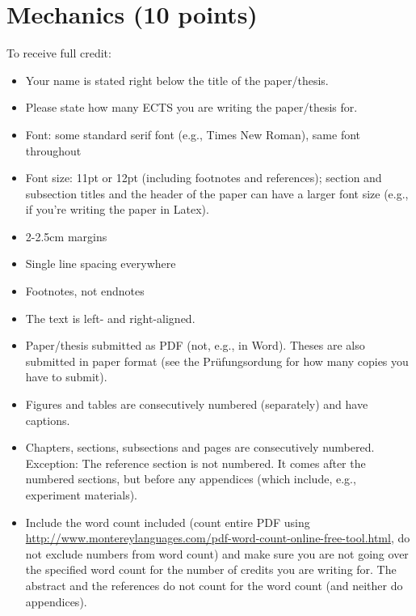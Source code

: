 \documentclass[11pt,fleqn,a4paper/thesis]{article}
\newcommand{\6}{\mbox{$[\hspace*{-.6mm}[$}}
\newcommand{\9}{\mbox{$]\hspace*{-.6mm}]$}}
\begin{document}
\section{Mechanics (10 points)}

To receive full credit:

\begin{itemize}[itemsep=-1pt,leftmargin=2.5ex,topsep=-2pt]

\item Your name is stated right below the title of the paper/thesis. 

\item Please state how many ECTS you are writing the paper/thesis for.

\item Font: some standard serif font (e.g., Times New Roman), same font throughout

\item Font size: 11pt or 12pt (including footnotes and references); section and subsection titles and the header of the paper can have a larger font size (e.g., if you're writing the paper in Latex).

\item 2-2.5cm margins 

\item Single line spacing everywhere

\item Footnotes, not endnotes

\item The text is left- and right-aligned.

\item Paper/thesis submitted as PDF (not, e.g., in Word). Theses are also submitted in paper format (see the  Pr\"ufungsordung for how many copies you have to submit).

\item Figures and tables are consecutively numbered (separately) and have captions.

\item Chapters, sections, subsections and pages are consecutively numbered. Exception: The reference section is not numbered. It comes after the numbered sections, but before any appendices (which include, e.g., experiment materials).

\item Include the word count included (count entire PDF using \url{http://www.montereylanguages.com/pdf-word-count-online-free-tool.html}, do not exclude numbers from word count) and make sure you are not going over the specified word count for the number of credits you are writing for. The abstract and the references do not count for the word count (and neither do appendices).


\end{itemize}
\end{document}
